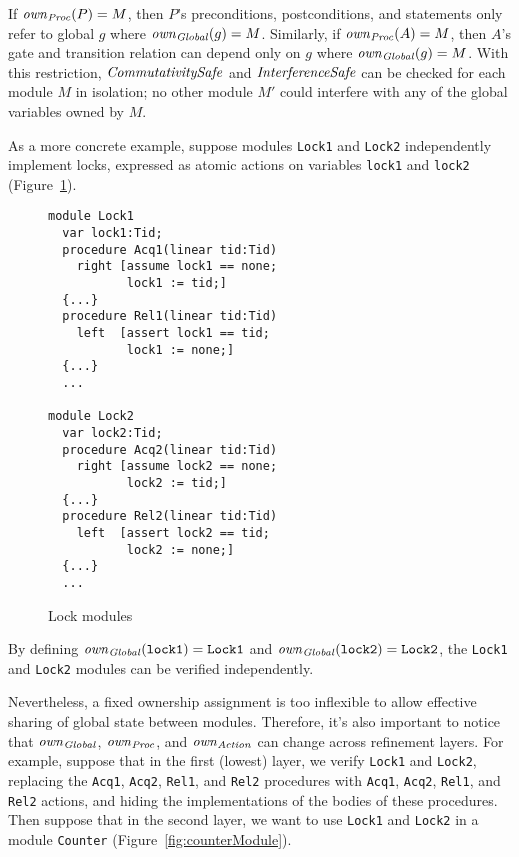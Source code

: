 \noindent
If $\mathit{own}_{\mathit{Proc}}(P) = M$, then $P$'s preconditions, postconditions, and statements only refer to global $g$ where $\mathit{own}_{\mathit{Global}}(g) = M$.
Similarly, if $\mathit{own}_{\mathit{Proc}}(A) = M$, then $A$'s gate and transition relation can depend only on $g$ where $\mathit{own}_{\mathit{Global}}(g) = M$.
With this restriction, $\mathit{CommutativitySafe}$ and $\mathit{InterferenceSafe}$ can be checked for each module $M$ in isolation;
no other module $M'$ could interfere with any of the global variables owned by $M$.

As a more concrete example, suppose modules \verb`Lock1` and \verb`Lock2` independently implement locks,
expressed as atomic actions on variables \verb`lock1` and \verb`lock2` (Figure~\ref{fig:lockModules}).

\begin{figure}
\begin{verbatim}
module Lock1
  var lock1:Tid;
  procedure Acq1(linear tid:Tid)
    right [assume lock1 == none;
           lock1 := tid;]
  {...}
  procedure Rel1(linear tid:Tid)
    left  [assert lock1 == tid;
           lock1 := none;]
  {...}
  ...

module Lock2
  var lock2:Tid;
  procedure Acq2(linear tid:Tid)
    right [assume lock2 == none;
           lock2 := tid;]
  {...}
  procedure Rel2(linear tid:Tid)
    left  [assert lock2 == tid;
           lock2 := none;]
  {...}
  ...
\end{verbatim}
\caption{Lock modules}
\label{fig:lockModules}
\end{figure}

By defining $\mathit{own}_{\mathit{Global}}(\mathtt{lock1}) = \mathtt{Lock1}$ and $\mathit{own}_{\mathit{Global}}(\mathtt{lock2}) = \mathtt{Lock2}$,
the \verb`Lock1` and \verb`Lock2` modules can be verified independently.

Nevertheless, a fixed ownership assignment is too inflexible to allow effective sharing of global state between modules.
Therefore, it's also important to notice that $\mathit{own}_{\mathit{Global}}$, $\mathit{own}_{\mathit{Proc}}$, and $\mathit{own}_{\mathit{Action}}$ can change across refinement layers.
For example, suppose that in the first (lowest) layer,
we verify \verb`Lock1` and \verb`Lock2`,
replacing the \verb`Acq1`, \verb`Acq2`, \verb`Rel1`, and \verb`Rel2` procedures with \verb`Acq1`, \verb`Acq2`, \verb`Rel1`, and \verb`Rel2` actions,
and hiding the implementations of the bodies of these procedures.
Then suppose that in the second layer,
we want to use \verb`Lock1` and \verb`Lock2` in a module \verb`Counter` (Figure~\ref{fig:counterModule}).

